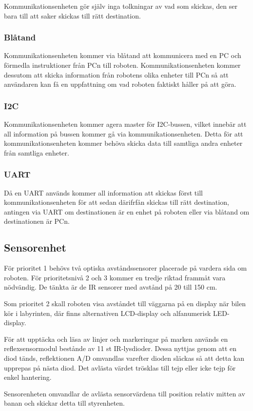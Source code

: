 \documentclass[a4paper,12pt]{article}
\begin{document}
Kommunikationsenheten gör själv inga tolkningar av vad som skickas, den ser bara
till att saker skickas till rätt destination.
\subsubsection{Blåtand}
Kommunikationsenheten kommer via blåtand att kommunicera med en PC och förmedla
instruktioner från PCn till roboten. Kommunikationsenheten kommer dessutom att
skicka information från robotens olika enheter till PCn så att användaren kan få
en uppfattning om vad roboten faktiskt håller på att göra.
\subsubsection{I2C}
Kommunikationsenheten kommer agera master för I2C-bussen, vilket innebär att all
information på bussen kommer gå via kommunikationsenheten. Detta för att
kommunikationsenheten kommer behöva skicka data till samtliga andra enheter från
samtliga enheter.
\subsubsection{UART}
Då en UART används kommer all information att skickas först till
kommunikationsenheten för att sedan därifrfån skickas till rätt destination,
antingen via UART om destinationen är en enhet på roboten eller via blåtand om
destinationen är PCn.


\subsection{Sensorenhet}
För prioritet 1 behövs två  optiska avståndssensorer placerade på vardera sida om roboten. För prioritetsnivå 2 och 3 kommer en tredje riktad frammåt vara nödvändig. De tänkta är de IR sensorer med avstånd på 20 till 150 cm. 

Som prioritet 2 skall roboten visa avståndet till väggarna på en display när bilen kör i labyrinten, där finns alternativen LCD-display och alfanumerisk LED-display.

För att upptäcka och läsa av linjer och markeringar på marken används en reflexsensormodul bestånde av 11 st IR-lysdioder. Dessa nyttjas genom att en diod tänds, reflektionen A/D omvandlas varefter dioden släckas så att detta kan upprepas på nästa diod. Det avlästa värdet trösklas till tejp eller icke tejp för enkel hantering.

Sensorenheten omvandlar de avlästa sensorvärdena till position relativ mitten av banan och skickar detta till styrenheten.
\end{document}
